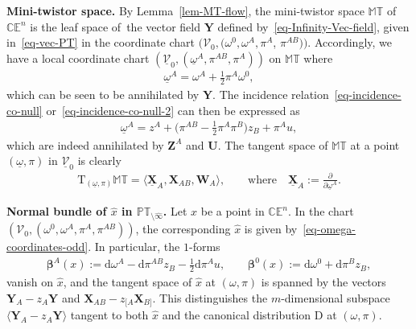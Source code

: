\documentclass[10pt,a4paper]{amsart}
\numberwithin{equation}{section}
\newcommand{\parderv}[2] {\frac{\partial#1}{\partial#2}}
\newcommand{\mc} [1]{\mathcal{#1}}
\newcommand{\Drm} {{\mathrm{D}}}
\newcommand{\dd} {\mathrm{d}}
\newcommand{\Tgt} {\mathrm{T}}
\newcommand{\PT} {\mathbb{PT}}
\newcommand{\T} {\mathbb{T}}
\newcommand{\E} {\mathbb{E}}
\newcommand{\M} {\mathbb{M}}
\newcommand{\C} {\mathbb{C}}
\begin{document}
{\bf Mini-twistor space.} By Lemma~\ref{lem-MT-flow}, the mini-twistor space $\M\T$ of $\C \E^n$ is the leaf space of~the vector f\/ield $\bm{Y}$ def\/ined by~\eqref{eq-Infinity-Vec-field}, given in~\eqref{eq-vec-PT} in the coordinate chart $(\mc{V}_0, (\omega^0, \omega^A, \pi^A$, $\pi^{AB}))$. Accordingly, we have a local coordinate chart $(\underline{\mc{V}}_0, ( \underline{\omega}^{A} , \pi^{AB} , \pi^{A} ))$ on $\M\T$ where
\begin{gather*}
\underline{\omega}^{A} = \omega^{A}+ \tfrac{1}{2} \pi^{A} \omega^0 ,
\end{gather*}
which can be seen to be annihilated by $\bm{Y}$. The incidence relation~\eqref{eq-incidence-co-null} or~\eqref{eq-incidence-co-null-2} can then be expressed as
\begin{gather*}
\underline{\omega}^{A} = z^{A} + \big( \pi^{AB} - \tfrac{1}{2} \pi^{A} \pi^{B} \big) z_{B}+ \pi^{A} u ,
\end{gather*}
which are indeed annihilated by $\bm{Z}^A$ and $\bm{U}$. The tangent space of $\M\T$ at a point $(\underline{\omega},\pi)$ in $\underline{\mc{V}}_0$ is clearly
\begin{gather*}
\Tgt_{(\underline{\omega},\pi)} \M\T = \langle \underline{\bm{X}}_A , \bm{X}_{AB} , \bm{W}_A \rangle , \qquad \text{where} \quad \underline{\bm{X}}_A := \parderv{}{\underline{\omega}^A} .
\end{gather*}

{\bf Normal bundle of $\hat{x}$ in $\PT_{\setminus \widehat{\infty}}$.} Let $x$ be a point in $\C \E^n$. In the chart $(\mc{V}_0, (\omega^0, \omega^A, \pi^A, \pi^{AB}))$, the corresponding $\hat{x}$ is given by~\eqref{eq-omega-coordinates-odd}. In particular, the $1$-forms
\begin{gather*}
\bm{\beta}^A (x) := \dd \omega^A - \dd \pi^{AB} z_B - \tfrac{1}{2} \dd \pi^A u , \qquad \bm{\beta}^0 (x) := \dd \omega^0 + \dd \pi^B z_B ,
\end{gather*}
vanish on $\hat{x}$, and the tangent space of $\hat{x}$ at $(\omega,\pi)$ is spanned by the vectors $\bm{Y}_A - z_A \bm{Y}$ and $\bm{X}_{AB} - z_{[A} \bm{X}_{B]}$. This distinguishes the $m$-dimensional subspace $\langle \bm{Y}_A - z_A \bm{Y}\rangle$ tangent to both $\hat{x}$ and the canonical distribution $\Drm$ at $(\omega,\pi)$.
\end{document}
